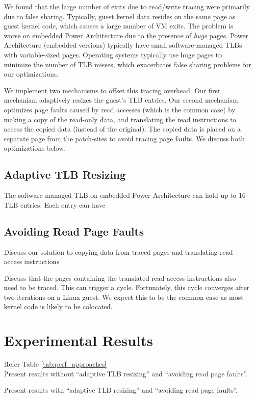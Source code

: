 \documentclass[10pt,twocolumn]{article}
\begin{document}
We found that the large number of exits due to read/write tracing were primarily
due to false sharing. Typically, guest kernel data resides on the same page as
guest kernel code, which causes a large number of VM exits. The problem is
worse on embedded Power Architecture due to the presence of {\em huge} pages.
Power Architecture (embedded versions) typically have small software-managed
TLBs with variable-sized pages. Operating systems typically use huge pages to
minimize the number of TLB misses, which exacerbates false sharing problems for
our optimizations.

We implement two mechanisms to offset this tracing overhead. Our first mechanism
adaptively resizes the guest's TLB entries. Our second mechanism optimizes page faults
caused by read accesses (which is the common case) by making a copy of
the read-only data, and translating the read instructions
to access the copied data (instead of the original). The copied data is placed on
a separate page from the patch-sites to avoid tracing page faults. We discuss
both optimizations below.

\subsection{Adaptive TLB Resizing}
The software-managed TLB on embedded Power Architecture can hold up to 16 TLB
entries. Each entry can have 

\subsection{Avoiding Read Page Faults}
Discuss our solution to copying data from traced pages and translating read-access
instructions

Discuss that the pages containing the translated read-access instructions also need
to be traced. This can trigger a cycle. Fortunately, this cycle converges after
two iterations on a Linux guest. We expect this to be the common case as most kernel code
is likely to be colocated.

\section{Experimental Results}
\label{sec:results}
Refer Table \ref{tab:perf_approaches}\\
Present results without ``adaptive TLB resizing'' and ``avoiding read page faults''.

Present results with ``adaptive TLB resizing'' and ``avoiding read page faults''.
\end{document}
